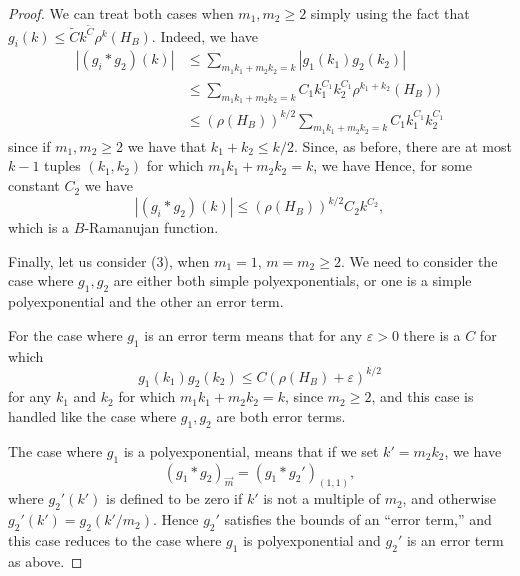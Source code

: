 \documentclass{memo-l}
\theoremstyle{plain}
\theoremstyle{definition}
\numberwithin{section}{chapter}
\numberwithin{equation}{chapter}
\newcommand{\rhoroot}[1]{\rho^{1/2}(H_{#1})}
\theoremstyle{plain}
\theoremstyle{definition}
\begin{document}
\begin{proof}
We can treat both cases when \( m_1, m_2 \geq 2 \) simply using the fact
that \( g_i(k) \leq \widetilde C k^{\widetilde C} \rho^k(H_B)\). Indeed, we
have \begin{align*} | (g_i \ast g_2)(k) | &\leq \sum_{m_1k_1+m_2k_2=k}
|g_1(k_1)g_2(k_2)| \\ &\leq \sum_{m_1k_1+m_2k_2=k} C_1 k_1^{C_1} k_2^{C_1}
\rho^{k_1+k_2}(H_B)) \\ &\leq (\rho(H_B))^{k/2} \sum_{m_1k_1+m_2k_2=k} C_1
k_1^{C_1} k_2^{C_1} \end{align*} since if \(m_1, m_2 \geq 2 \) we have that
\( k_1+k_2 \leq k/2 \).
Since, as before, there are at most $k-1$ tuples $(k_1,k_2)$ for which
$m_1k_1+m_2k_2=k$, we have
Hence, for some constant \( C_2 \) we have
$$
| (g_i \ast g_2)(k) | \le (\rho(H_B))^{k/2} C_2k^{C_2},
$$
which is a $B$-Ramanujan function.

Finally, let us consider (3), when \(m_1 = 1\), \(m=m_2 \geq 2\).
We need to consider the case where $g_1,g_2$ are either both
simple polyexponentials, or one is a simple polyexponential and the
other an error term.  

For the case where $g_1$ is an error term means that for any
$\varepsilon>0$ there is a $C$ for which
$$
g_1(k_1)g_2(k_2) \le C (\rho(H_B)+\varepsilon)^{k/2}
$$
for any $k_1$ and $k_2$ for which $m_1 k_1+m_2 k_2=k$, since $m_2\ge 2$,
and this case is handled
like the case where $g_1,g_2$ are both error terms.

The case where $g_1$ is a polyexponential, means that if we set
$k'=m_2 k_2$, we have 
$$
(g_1 \ast g_2)_{\vec m} = (g_1 \ast g_2')_{(1,1)},
$$
where $g_2'(k')$ is defined to be zero if $k'$ is not a multiple of $m_2$,
and
otherwise $g_2'(k')=g_2(k'/m_2)$.  Hence $g_2'$ satisfies the bounds of
an ``error term,''
and this case reduces to the case where $g_1$ is polyexponential
and $g_2'$ is an error term as above.


\end{proof}
\end{document}
